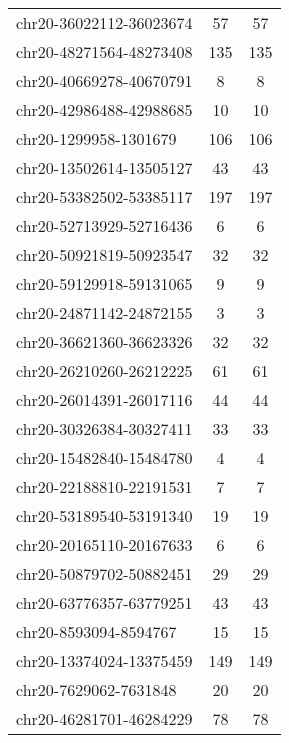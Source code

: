 \begin{longtable}{lSS}
	chr20-36022112-36023674 & 57     & 57                         \\
	chr20-48271564-48273408 & 135    & 135                        \\
	chr20-40669278-40670791 & 8      & 8                          \\
	chr20-42986488-42988685 & 10     & 10                         \\
	chr20-1299958-1301679   & 106    & 106                        \\
	chr20-13502614-13505127 & 43     & 43                         \\
	chr20-53382502-53385117 & 197    & 197                        \\
	chr20-52713929-52716436 & 6      & 6                          \\
	chr20-50921819-50923547 & 32     & 32                         \\
	chr20-59129918-59131065 & 9      & 9                          \\
	chr20-24871142-24872155 & 3      & 3                          \\
	chr20-36621360-36623326 & 32     & 32                         \\
	chr20-26210260-26212225 & 61     & 61                         \\
	chr20-26014391-26017116 & 44     & 44                         \\
	chr20-30326384-30327411 & 33     & 33                         \\
	chr20-15482840-15484780 & 4      & 4                          \\
	chr20-22188810-22191531 & 7      & 7                          \\
	chr20-53189540-53191340 & 19     & 19                         \\
	chr20-20165110-20167633 & 6      & 6                          \\
	chr20-50879702-50882451 & 29     & 29                         \\
	chr20-63776357-63779251 & 43     & 43                         \\
	chr20-8593094-8594767   & 15     & 15                         \\
	chr20-13374024-13375459 & 149    & 149                        \\
	chr20-7629062-7631848   & 20     & 20                         \\
	chr20-46281701-46284229 & 78     & 78                         \\

\end{longtable}
